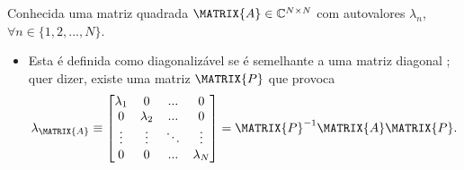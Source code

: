 \begin{definition}\label{def:diagonalization0}
Conhecida uma matriz quadrada $\MATRIX{A} \in \mathbb{C}^{N \times N}$ com
autovalores $\lambda_n$, $\forall n \in \{1, 2, ..., N\}$.
\begin{itemize}
\item Esta é definida como diagonalizável se é semelhante a uma matriz diagonal \cite[pp. 67]{golub2013matrix};
quer dizer, existe uma matriz $\MATRIX{P}$ que provoca
\begin{equation}
\lambda_\MATRIX{A}\equiv
\begin{bmatrix}
\lambda_1 & 0         & ...    & 0 \\
0         & \lambda_2 & ...    & 0 \\
\vdots    & \vdots    & \ddots & \vdots \\
0         & 0         & ...    & \lambda_N
\end{bmatrix}
=\MATRIX{P}^{-1}\MATRIX{A}\MATRIX{P}.
\end{equation}
\end{itemize}
\end{definition}



